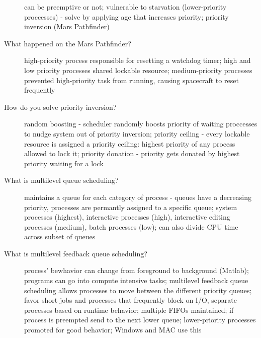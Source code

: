 \documentclass[10pt]{article}
\begin{document}
\begin{description}
  can be preemptive or not; vulnerable to starvation (lower-priority proccesses) - solve by applying age that increases priority;
  priority inversion (Mars Pathfinder)
\item[What happened on the Mars Pathfinder?]
  high-priority process responsible for resetting a watchdog timer;
  high and low priority processes shared lockable resource;
  medium-priority processes prevented high-priority task from running, causing spacecraft to reset frequently
\item[How do you solve priority inversion?]
  random boosting - scheduler randomly boosts priority of waiting proccesses to nudge system out of priority inversion;
  priority ceiling - every lockable resource is assigned a priority ceiling: highest priority of any process allowed to lock it;
  priority donation - priority gets donated by highest priority waiting for a lock
\item[What is multilevel queue scheduling?]
  maintains a queue for each category of process - queues have a decreasing priority, processes are permantly assigned to a specific queue;
  system processes (highest), interactive processes (high), interactive editing processes (medium), batch processes (low);
  can also divide CPU time across subset of queues
\item[What is multilevel feedback queue scheduling?]
  process' bewhavior can change from foreground to background (Matlab);
  programs can go into compute intensive tasks;
  multilevel feedback queue scheduling allows processes to move between the different priority queues;
  favor short jobs and processes that frequently block on I/O, separate processes based on runtime behavior;
  multiple FIFOs maintained; if process is preempted send to the next lower queue; lower-priority processes promoted for good behavior;
  Windows and MAC use this
\end{description}
\end{document}
